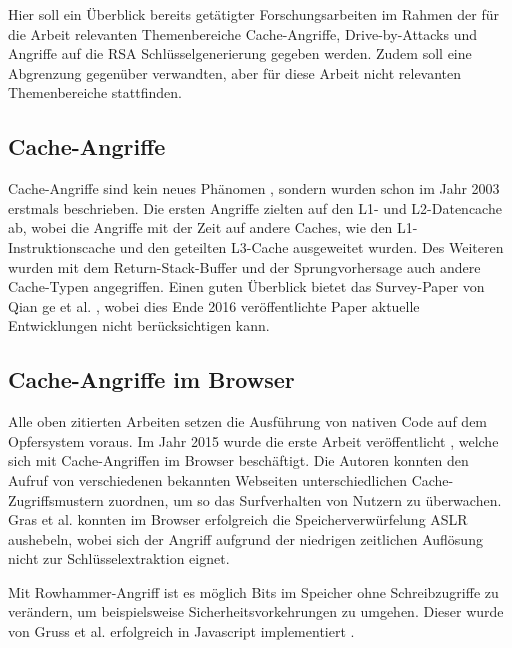 Hier soll ein Überblick bereits getätigter Forschungsarbeiten im Rahmen der für die Arbeit relevanten Themenbereiche Cache-Angriffe, Drive-by-Attacks und Angriffe auf die RSA Schlüsselgenerierung gegeben werden. Zudem soll eine Abgrenzung gegenüber verwandten, aber für diese Arbeit nicht relevanten Themenbereiche stattfinden.

\subsection{Cache-Angriffe}

Cache-Angriffe sind kein neues Phänomen \cite{BernsteinAES, CacheAttacksCountermeasuresAESShamir}, sondern wurden schon im Jahr 2003 \cite{DESCacheAttack2003} erstmals beschrieben.
Die ersten Angriffe zielten auf den L1- und L2-Datencache \cite{CacheAttacksCountermeasuresAESShamir} ab, wobei die Angriffe mit der Zeit auf andere Caches, wie den L1-Instruktionscache \cite{NewResultsInstructionCacheAttacks} und den geteilten L3-Cache \cite{CacheAttacksCloud, LiuPrimeAndProbe} ausgeweitet wurden.
Des Weiteren wurden mit dem Return-Stack-Buffer \cite{Maisuradze2018ret2specSE} und der Sprungvorhersage \cite{BranchPredictionVulnerabilitiesOpenSSL, PredictingSecretKeysViaBranchPrediction, CovertChannelsThroughBranchPredictors} auch andere Cache-Typen angegriffen.
Einen guten Überblick bietet das Survey-Paper von Qian ge et al. \cite{SurveyTimingAttacksCountermeasures}, wobei dies Ende 2016 veröffentlichte Paper aktuelle Entwicklungen nicht berücksichtigen kann.

\subsection{Cache-Angriffe im Browser}

Alle oben zitierten Arbeiten setzen die Ausführung von nativen Code auf dem Opfersystem voraus. Im Jahr 2015 wurde die erste Arbeit veröffentlicht \cite{TheSpyInTheSandbox}, welche sich mit Cache-Angriffen im Browser beschäftigt.
Die Autoren konnten den Aufruf von verschiedenen bekannten Webseiten unterschiedlichen Cache-Zugriffsmustern zuordnen, um so das Surfverhalten von Nutzern zu überwachen.
Gras et al. \cite{ASLROnTheLine} konnten im Browser erfolgreich die Speicherverwürfelung ASLR aushebeln, wobei sich der Angriff aufgrund der niedrigen zeitlichen Auflösung nicht zur Schlüsselextraktion eignet.

Mit Rowhammer-Angriff \cite{Rowhammer} ist es möglich Bits im Speicher ohne Schreibzugriffe zu verändern, um beispielsweise Sicherheitsvorkehrungen zu umgehen. 
Dieser wurde von Gruss et al. erfolgreich in Javascript implementiert \cite{RowhammerJS}.

